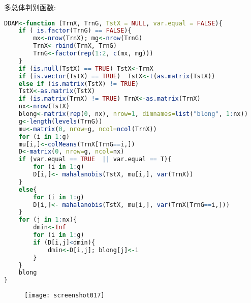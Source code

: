 \documentclass[11pt,a4paper,oneside]{book}
\begin{document}
多总体判别函数:
\begin{lstlisting}[language=r]
DDAM<-function (TrnX, TrnG, TstX = NULL, var.equal = FALSE){
	if ( is.factor(TrnG) == FALSE){
		mx<-nrow(TrnX); mg<-nrow(TrnG)
		TrnX<-rbind(TrnX, TrnG)
		TrnG<-factor(rep(1:2, c(mx, mg)))
	}
	if (is.null(TstX) == TRUE) TstX<-TrnX
	if (is.vector(TstX) == TRUE)  TstX<-t(as.matrix(TstX))
	else if (is.matrix(TstX) != TRUE)
	TstX<-as.matrix(TstX)
	if (is.matrix(TrnX) != TRUE) TrnX<-as.matrix(TrnX)
	nx<-nrow(TstX)
	blong<-matrix(rep(0, nx), nrow=1, dimnames=list("blong", 1:nx))
	g<-length(levels(TrnG))
	mu<-matrix(0, nrow=g, ncol=ncol(TrnX))
	for (i in 1:g)
	mu[i,]<-colMeans(TrnX[TrnG==i,]) 
	D<-matrix(0, nrow=g, ncol=nx)
	if (var.equal == TRUE  || var.equal == T){
		for (i in 1:g)
		D[i,]<- mahalanobis(TstX, mu[i,], var(TrnX))
	}
	else{
		for (i in 1:g)
		D[i,]<- mahalanobis(TstX, mu[i,], var(TrnX[TrnG==i,]))
	}
	for (j in 1:nx){
		dmin<-Inf
		for (i in 1:g)
		if (D[i,j]<dmin){
			dmin<-D[i,j]; blong[j]<-i
		}
	}
	blong
}

\end{lstlisting}
\begin{figure}[H]
	\centering
	\texttt{[image: screenshot017]}
\end{figure}
\end{document}

